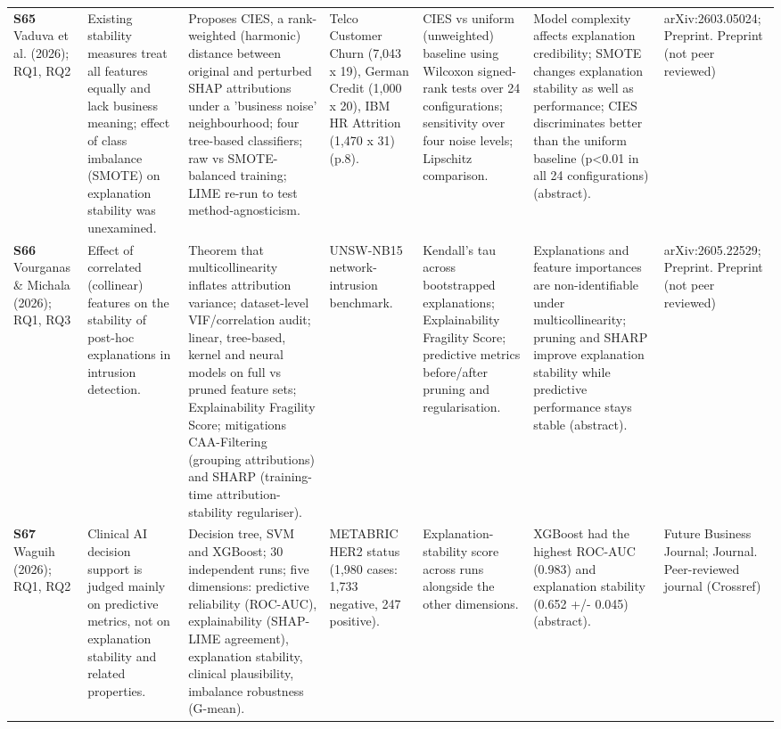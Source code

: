 \begin{longtable}{@{}P{1.55cm}P{2.9cm}P{4.5cm}P{3.2cm}P{3.4cm}P{4.6cm}P{3.6cm}@{}}
\textbf{S65} \cite{S65} Vaduva et al. (2026); RQ1, RQ2 & Existing stability measures treat all features equally and lack business meaning; effect of class imbalance (SMOTE) on explanation stability was unexamined. & Proposes CIES, a rank-weighted (harmonic) distance between original and perturbed SHAP attributions under a 'business noise' neighbourhood; four tree-based classifiers; raw vs SMOTE-balanced training; LIME re-run to test method-agnosticism. & Telco Customer Churn (7,043 x 19), German Credit (1,000 x 20), IBM HR Attrition (1,470 x 31) (p.8). & CIES vs uniform (unweighted) baseline using Wilcoxon signed-rank tests over 24 configurations; sensitivity over four noise levels; Lipschitz comparison. & Model complexity affects explanation credibility; SMOTE changes explanation stability as well as performance; CIES discriminates better than the uniform baseline (p\textless{}0.01 in all 24 configurations) (abstract). & arXiv:2603.05024; Preprint. Preprint (not peer reviewed) \\
\textbf{S66} \cite{S66} Vourganas \& Michala (2026); RQ1, RQ3 & Effect of correlated (collinear) features on the stability of post-hoc explanations in intrusion detection. & Theorem that multicollinearity inflates attribution variance; dataset-level VIF/\allowbreak{}correlation audit; linear, tree-based, kernel and neural models on full vs pruned feature sets; Explainability Fragility Score; mitigations CAA-Filtering (grouping attributions) and SHARP (training-time attribution-stability regulariser). & UNSW-NB15 network-intrusion benchmark. & Kendall's tau across bootstrapped explanations; Explainability Fragility Score; predictive metrics before/\allowbreak{}after pruning and regularisation. & Explanations and feature importances are non-identifiable under multicollinearity; pruning and SHARP improve explanation stability while predictive performance stays stable (abstract). & arXiv:2605.22529; Preprint. Preprint (not peer reviewed) \\
\textbf{S67} \cite{S67} Waguih (2026); RQ1, RQ2 & Clinical AI decision support is judged mainly on predictive metrics, not on explanation stability and related properties. & Decision tree, SVM and XGBoost; 30 independent runs; five dimensions: predictive reliability (ROC-AUC), explainability (SHAP-LIME agreement), explanation stability, clinical plausibility, imbalance robustness (G-mean). & METABRIC HER2 status (1,980 cases: 1,733 negative, 247 positive). & Explanation-stability score across runs alongside the other dimensions. & XGBoost had the highest ROC-AUC (0.983) and explanation stability (0.652 +/\allowbreak{}- 0.045) (abstract). & Future Business Journal; Journal. Peer-reviewed journal (Crossref) \\

\end{longtable}
